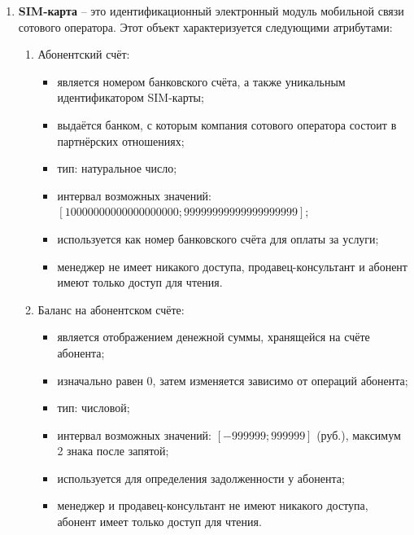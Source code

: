 \begin{enumerate}
    \item \textbf{SIM-карта} -- это идентификационный электронный модуль мобильной связи сотового оператора. Этот объект характеризуется следующими атрибутами:
    \begin{enumerate}
        \item Абонентский счёт:
        \begin{itemize}
            \item является номером банковского счёта, а также уникальным идентификатором SIM-карты;
            \item выдаётся банком, с которым компания сотового оператора состоит в партнёрских отношениях;
            \item тип: натуральное число;
            \item интервал возможных значений: $[10 000 000 000 000 000 000; 99 999 999 999 999 999 999]$;
            \item используется как номер банковского счёта для оплаты за услуги;
            \item менеджер не имеет никакого доступа, продавец-консультант и абонент имеют только доступ для чтения.
        \end{itemize}

        \item Баланс на абонентском счёте:
        \begin{itemize}
            \item является отображением денежной суммы, хранящейся на счёте абонента;
            \item изначально равен 0, затем изменяется зависимо от операций абонента;
            \item тип: числовой;
            \item интервал возможных значений: $[-999 999; 999 999]$ (руб.), максимум 2 знака после запятой; %
            \item используется для определения задолженности у абонента;
            \item менеджер и продавец-консультант не имеют никакого доступа, абонент имеет только доступ для чтения.
        \end{itemize}


\end{enumerate}
\end{enumerate}
